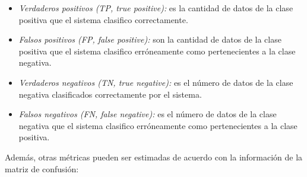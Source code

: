 \documentclass[10pt, a4paper]{article}
\begin{document}
\begin{itemize}
    \item \textit{Verdaderos positivos (TP, true positive):} es la cantidad de datos de la clase positiva que el sistema clasifico correctamente.

    \item \textit{Falsos positivos (FP, false positive):} son la cantidad de datos de la clase positiva que el sistema clasifico erróneamente como pertenecientes a la clase negativa.

    \item \textit{Verdaderos negativos (TN, true negative):} es el número de datos de la clase negativa clasificados correctamente por el sistema.

    \item \textit{Falsos negativos (FN, false negative):} es el número de datos de la clase negativa que el sistema clasifico erróneamente como pertenecientes a la clase positiva.
    
\end{itemize}

Además, otras métricas pueden ser estimadas de acuerdo con la información de la matriz de confusión:
\end{document}
